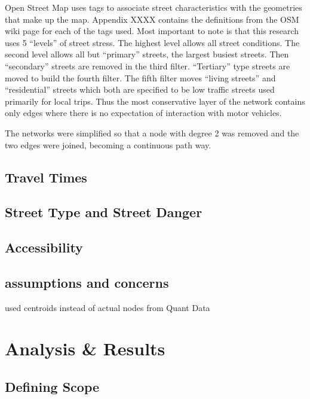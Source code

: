 \documentclass[11pt]{article} %
\begin{document}
Open Street Map uses tags to associate street characteristics with the geometries that make up the map. Appendix XXXX contains the definitions from the OSM wiki page for each of the tags used. Most important to note is that this research uses 5 ``levels'' of street stress. The highest level allows all street conditions. The second level allows all but ``primary'' streets, the largest busiest streets. Then ``secondary'' streets are removed in the third filter. ``Tertiary'' type streets are moved to build the fourth filter. The fifth filter moves ``living streets'' and ``residential'' streets which both are specified to be low traffic streets used primarily for local trips. Thus the most conservative layer of the network contains only edges where there is no expectation of interaction with motor vehicles. 



The networks were simplified so that a node with degree 2 was removed and the two edges were joined, becoming a continuous path way. 




\subsection{Travel Times}

\subsection{Street Type and Street Danger}

\subsection{Accessibility}

\subsection{assumptions and concerns}

used centroids instead of actual nodes from Quant Data


\section{Analysis \& Results}

\subsection{Defining Scope}
\end{document}
